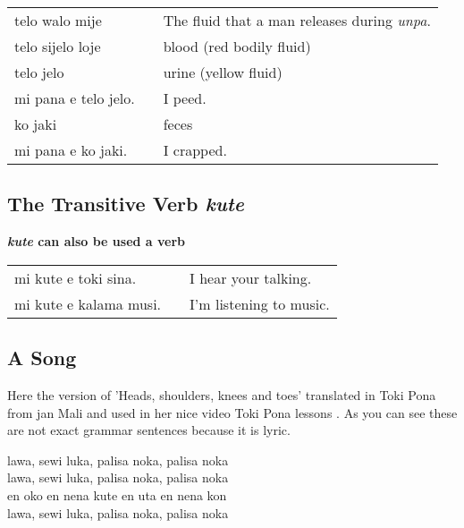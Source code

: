 \begin{supertabular}{p{5,5cm}|ll}
    telo walo mije       &  & The fluid that a man releases during \textit{unpa}. \\
    telo sijelo loje     &  & blood (red bodily fluid)                            \\
    telo jelo            &  & urine (yellow fluid)                                \\
    mi pana e telo jelo. &  & I peed.                                             \\
    ko jaki              &  & feces                                               \\
    mi pana e ko jaki.   &  & I crapped.                                          \\
\end{supertabular}

%
\subsection*{The Transitive Verb \textit{kute}}

\textbf{\textit{kute} can also be used a verb} \\
\begin{supertabular}{p{5,5cm}|ll}
    mi kute e toki sina.   &  & I hear your talking.    \\
    mi kute e kalama musi. &  & I'm listening to music. \\
\end{supertabular}

%
\subsection*{A Song}
%

Here the version of 'Heads, shoulders, knees and toes' translated in Toki Pona from jan Mali and used in her nice video Toki Pona lessons \cite{www:astrodonunt:02}.
As you can see these are not exact grammar sentences because it is lyric.

lawa, sewi luka, palisa noka, palisa noka \\
lawa, sewi luka, palisa noka, palisa noka \\
en oko en nena kute en uta en nena kon \\
lawa, sewi luka, palisa noka, palisa noka \\

